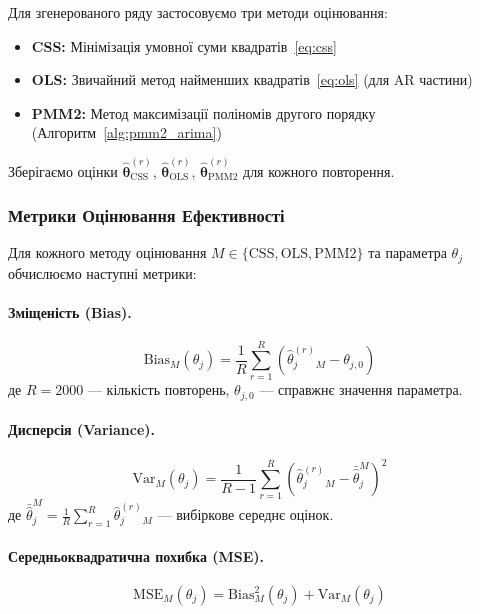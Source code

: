 \documentclass[12pt,a4paper]{article}
\begin{document}
Для згенерованого ряду застосовуємо три методи оцінювання:
\begin{itemize}
    \item \textbf{CSS:} Мінімізація умовної суми квадратів~\eqref{eq:css}
    \item \textbf{OLS:} Звичайний метод найменших квадратів~\eqref{eq:ols} (для AR частини)
    \item \textbf{PMM2:} Метод максимізації поліномів другого порядку (Алгоритм~\ref{alg:pmm2_arima})
\end{itemize}

Зберігаємо оцінки $\hat{\boldsymbol{\theta}}^{(r)}_{\text{CSS}}$, $\hat{\boldsymbol{\theta}}^{(r)}_{\text{OLS}}$, $\hat{\boldsymbol{\theta}}^{(r)}_{\text{PMM2}}$ для кожного повторення.

\subsubsection{Метрики Оцінювання Ефективності}

Для кожного методу оцінювання $M \in \{\text{CSS}, \text{OLS}, \text{PMM2}\}$ та параметра $\theta_j$ обчислюємо наступні метрики:

\paragraph{Зміщеність (Bias).}
\begin{equation}
\label{eq:bias}
\text{Bias}_M(\theta_j) = \frac{1}{R} \sum_{r=1}^{R} \left( \hat{\theta}_j^{(r)}_M - \theta_{j,0} \right)
\end{equation}
де $R = 2000$ --- кількість повторень, $\theta_{j,0}$ --- справжнє значення параметра.

\paragraph{Дисперсія (Variance).}
\begin{equation}
\label{eq:variance}
\text{Var}_M(\theta_j) = \frac{1}{R-1} \sum_{r=1}^{R} \left( \hat{\theta}_j^{(r)}_M - \bar{\hat{\theta}}_j^M \right)^2
\end{equation}
де $\bar{\hat{\theta}}_j^M = \frac{1}{R} \sum_{r=1}^{R} \hat{\theta}_j^{(r)}_M$ --- вибіркове середнє оцінок.

\paragraph{Середньоквадратична похибка (MSE).}
\begin{equation}
\label{eq:mse}
\text{MSE}_M(\theta_j) = \text{Bias}_M^2(\theta_j) + \text{Var}_M(\theta_j)
\end{equation}
\end{document}
